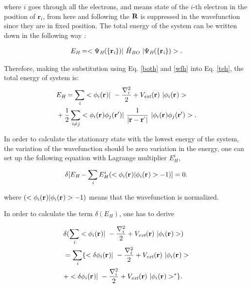 \documentclass[a4paper, 12pt, titlepage,oneside,drop]{kthesis}
\begin{document}

\noindent where $i$ goes through all the electrons, and  means state of the $i$-th electron in the position of ${\textbf{r}}_{\textit{i}}$, 
from here and following the $\textbf R$ is suppressed in the wavefunction since they are in fixed position. The total energy of the system can be written down 
in the following way :

\begin{equation}\label{teh}
E_{\textit{H}} = <\Psi_{{\textit H}}(\{ {\textbf r}_{{\textit i}}\}) |\ {\hat{H}}_{\textit{BO}} \ | \Psi_{{\textit H}}(\{ {\textbf r}_{{\textit i}}\})  >.
\end{equation}

\noindent Therefore, making the substitution using Eq. \ref{both} and \ref{wfh} into Eq. \ref{teh}, the total energy of system is:
\begin{equation}\begin{split}
&E_\textit{H} = \sumi<i> <\bwf<i><> |\ -\frac{\nabla^{2}_{i}}{2} + V_\textit{ext}(\textbf{r})  \ | \bwf<i><> > \\
& +\frac{1}{2} \suminj<i><j> <\bwf<i><> \bwfn<j><'>|\ \frac{1}{|\textbf{r} - \textbf{r}^{'} |} \ | \bwf<i><> \bwfn<j><'>>.
\end{split}\end{equation}

\noindent In order to calculate the stationary state with the lowest energy of the system, the variation of the wavefunction should be
zero variation in the energy, one can set up the following equation with Lagrange multiplier $E^{i}_H$,

\begin{equation}\label{haa}
 \delta [ E_{\textit{H}} - \sumi<i> E^{i}_{H} (<\bwf<i><> | \bwf<i><> > -1)] = 0. 
\end{equation}

where $(<\bwf<i><> | \bwf<i><> > -1)$ means that the wavefunction is normalized.

\noindent In order to calculate the term $\delta ( E_{\textit{H}} ) $, one has to derive

\begin{equation}\begin{split}\label{hartree1}
& \delta ( \sumi<i> <\bwf<i><> |\ -\frac{\nabla^{2}_{ i}}{2} + V_\textit{ext}(\textbf{r})  \ | \bwf<i><> > ) \\
&  = \sumi<i> \{ < \delta \bwf<i><> |\ -\frac{\nabla^{2}_{i}}{2} + V_\textit{ext}(\textbf{r})  \ | \bwf<i><> >  \\
&  + <  \delta \bwf<i><> |\ -\frac{\nabla^{2}_{i}}{2} + V_\textit{ext}(\textbf{r})  \ |  \bwf<i><> >^{\ast} \}.
\end{split}\end{equation}
\end{document}
